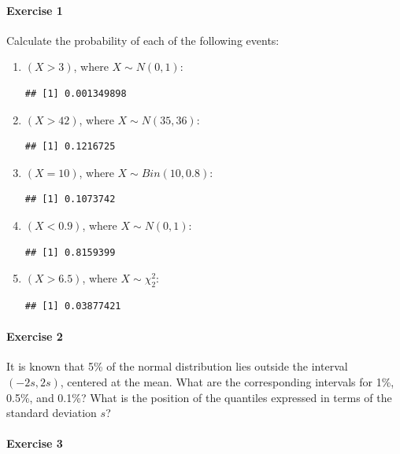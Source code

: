 \documentclass[
]{article}
\begin{document}
\hypertarget{exercise-1}{%
\paragraph{Exercise 1}\label{exercise-1}}

Calculate the probability of each of the following events:

\begin{enumerate}
\def\labelenumi{\arabic{enumi}.}
\item
  \((X > 3)\), where \(X \sim N(0,1)\):

\begin{verbatim}
## [1] 0.001349898
\end{verbatim}
\item
  \((X > 42)\), where \(X \sim N(35,36)\):

\begin{verbatim}
## [1] 0.1216725
\end{verbatim}
\item
  \((X = 10)\), where \(X \sim Bin(10,0.8)\):

\begin{verbatim}
## [1] 0.1073742
\end{verbatim}
\item
  \((X < 0.9)\), where \(X \sim N(0,1)\):

\begin{verbatim}
## [1] 0.8159399
\end{verbatim}
\item
  \((X > 6.5)\), where \(X \sim \chi^2_2\):

\begin{verbatim}
## [1] 0.03877421
\end{verbatim}
\end{enumerate}

\hypertarget{exercise-2}{%
\paragraph{Exercise 2}\label{exercise-2}}

It is known that 5\% of the normal distribution lies outside the
interval \((-2s, 2s)\), centered at the mean. What are the corresponding
intervals for 1\%, 0.5\%, and 0.1\%? What is the position of the
quantiles expressed in terms of the standard deviation \(s\)?

\hypertarget{exercise-3}{%
\paragraph{Exercise 3}\label{exercise-3}}
\end{document}
